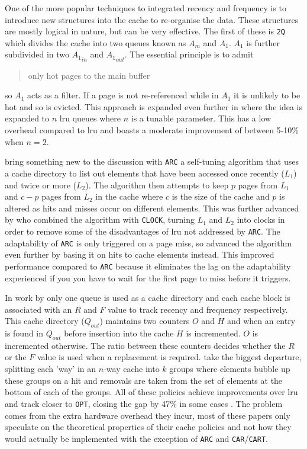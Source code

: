 One of the more popular techniques to integrated recency and frequency is to introduce new structures into the cache to re-organise the data. These structures are mostly logical in nature, but can be very effective. The first of these is \texttt{2Q} \cite{johnson2QLowOverhead1994} which divides the cache into two queues known as $A_m$ and $A_1$. $A_1$ is further subdivided in two ${A_1}_{in}$ and ${A_1}_{out}$. The essential principle is to admit \blockcquote{johnson2QLowOverhead1994}{only hot pages to the main buffer} so $A_1$ acts as a filter. If a page is not re-referenced while in $A_1$ it is unlikely to be hot and so is evicted. This approach is expanded even further in \citet{zhouMultiQueueReplacementAlgorithm2001} where the idea is expanded to $n$ \gls{lru} queues where $n$ is a tunable parameter. This has a low overhead compared to \gls{lru} and boasts a moderate improvement of between 5-10\% when $n=2$. 

\citet{megiddoARCSelfTuningLow2003} bring something new to the discussion with \texttt{ARC} a self-tuning algorithm that uses a cache directory to list out elements that have been accessed once recently ($L_1$) and twice or more  ($L_2$). The algorithm then attempts to keep $p$ pages from $L_1$ and $c-p$ pages from $L_2$ in the cache where $c$ is the size of the cache and $p$ is altered as hits and misses occur on different elements. This was further advanced by \citet{bansalCARClockAdaptive2004} who combined the algorithm with \texttt{CLOCK}\cite{corbatoPagingExperimentMultics1969}, turning $L_1$ and $L_2$ into clocks in order to remove some of the disadvantages of \gls{lru} not addressed by \texttt{ARC}. The adaptability of \texttt{ARC} is only triggered on a page miss, so \citet{chenSSARCShortSightedAdaptive2009} advanced the algorithm even further by basing it on hits to cache elements instead. This improved performance compared to \texttt{ARC} because it eliminates the lag on the adaptability experienced if you you have to wait for the first page to miss before it triggers.

In work by \citet{liCRFPNovelAdaptive2008} only one queue is used as a cache directory and each cache block is associated with an $R$ and $F$ value to track recency and frequency respectively. This cache directory ($Q_{out}$) maintains two counters $O$ and $H$ and when an entry is found in $Q_{out}$ before insertion into the cache $H$ is incremented. $O$ is incremented otherwise. The ratio between these counters decides whether the $R$ or the $F$ value is used when a replacement is required. \citet{zhangDivideandconquerBubbleReplacement2009} take the biggest departure, splitting each 'way' in an $n$-way cache into $k$ groups where elements bubble up these groups on a hit and removals are taken from the set of elements at the bottom of each of the groups. All of these policies achieve improvements over \gls{lru} and track closer to \texttt{OPT}, closing the gap by 47\% in some cases \cite{zhangDivideandconquerBubbleReplacement2009}. The problem comes from the extra hardware overhead they incur, most of these papers only speculate on the theoretical properties of their cache policies and not how they would actually be implemented with the exception of \texttt{ARC} and \texttt{CAR}/\texttt{CART}.

